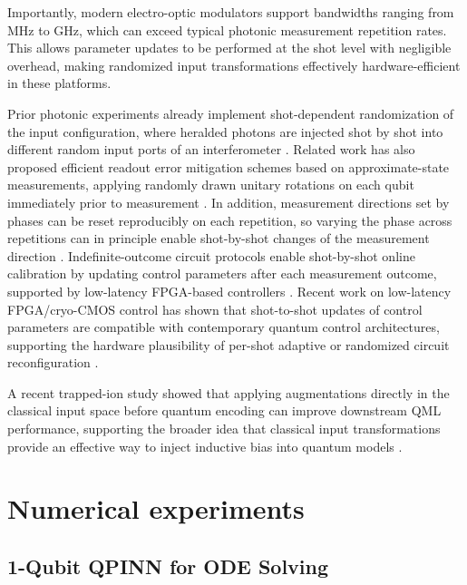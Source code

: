 \documentclass[%
 reprint,
 amsmath,amssymb,
 aps,
 pra,
]{revtex4-2}
\theoremstyle{definition}
\begin{document}
Importantly, modern electro-optic modulators support bandwidths ranging from MHz to GHz, which can exceed typical photonic measurement repetition rates. This allows parameter updates to be performed at the shot level with negligible overhead, making randomized input transformations effectively hardware-efficient in these platforms.

Prior photonic experiments already implement shot-dependent randomization of the input configuration, where heralded photons are injected shot by shot into different random input ports of an interferometer \cite{Marco2015}. Related work has also proposed efficient readout error mitigation schemes based on approximate-state measurements, applying randomly drawn unitary rotations on each qubit immediately prior to measurement \cite{Andrew2023}. In addition, measurement directions set by phases can be reset reproducibly on each repetition, so varying the phase across repetitions can in principle enable shot-by-shot changes of the measurement direction \cite{Ding2024}. Indefinite-outcome circuit protocols enable shot-by-shot online calibration by updating control parameters after each measurement outcome, supported by low-latency FPGA-based controllers \cite{Alicia2025}. Recent work on low-latency FPGA/cryo-CMOS control has shown that shot-to-shot updates of control parameters are compatible with contemporary quantum control architectures, supporting the hardware plausibility of per-shot adaptive or randomized circuit reconfiguration \cite{Miller2025}.

A recent trapped-ion study showed that applying augmentations directly in the classical input space before quantum encoding can improve downstream QML performance, supporting the broader idea that classical input transformations provide an effective way to inject inductive bias into quantum models \cite{Liudmila2025}.

\section{Numerical experiments}
\label{sec:experiment}

\subsection{1-Qubit QPINN for ODE Solving}
\end{document}
